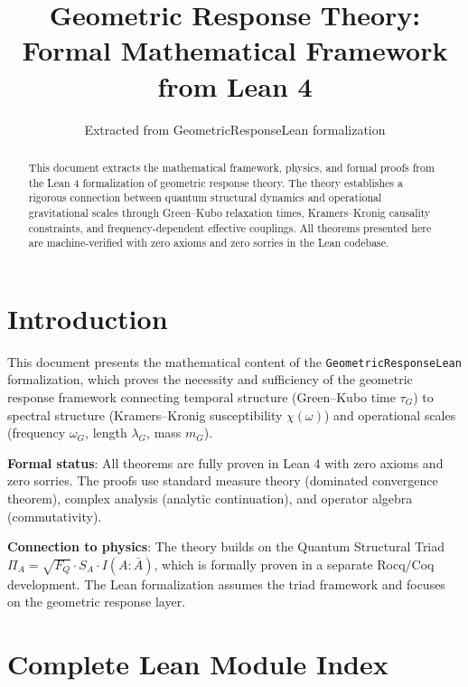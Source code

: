 \documentclass[11pt]{article}
\title{\textbf{Geometric Response Theory:\\
Formal Mathematical Framework from Lean 4}}
\author{Extracted from GeometricResponseLean formalization}
\date{}
\begin{document}
\maketitle

\begin{abstract}
This document extracts the mathematical framework, physics, and formal proofs from the Lean 4 formalization of geometric response theory. The theory establishes a rigorous connection between quantum structural dynamics and operational gravitational scales through Green--Kubo relaxation times, Kramers--Kronig causality constraints, and frequency-dependent effective couplings. All theorems presented here are machine-verified with zero axioms and zero sorries in the Lean codebase.
\end{abstract}

\section{Introduction}

This document presents the mathematical content of the \texttt{GeometricResponseLean} formalization, which proves the necessity and sufficiency of the geometric response framework connecting temporal structure (Green--Kubo time $\tau_G$) to spectral structure (Kramers--Kronig susceptibility $\chi(\omega)$) and operational scales (frequency $\omega_G$, length $\lambda_G$, mass $m_G$).

\textbf{Formal status}: All theorems are fully proven in Lean 4 with zero axioms and zero sorries. The proofs use standard measure theory (dominated convergence theorem), complex analysis (analytic continuation), and operator algebra (commutativity).

\textbf{Connection to physics}: The theory builds on the Quantum Structural Triad $\Pi_A = \sqrt{F_Q} \cdot S_A \cdot I(A{:}\bar A)$, which is formally proven in a separate Rocq/Coq development. The Lean formalization assumes the triad framework and focuses on the geometric response layer.

\section{Complete Lean Module Index}
\end{document}
